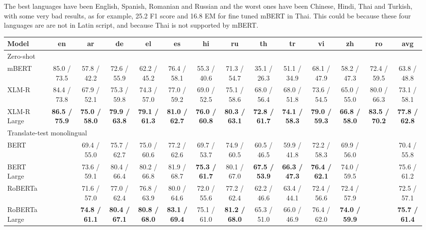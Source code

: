 \documentclass[11pt]{article}
\begin{document}
The best languages have been English, Spanish, Romanian and Russian and the worst ones have been Chinese, Hindi, Thai and Turkish, with some very bad results, as for example, 25.2 F1 score and 16.8 EM for fine tuned mBERT in Thai. This could be because these four languages are are not in Latin script, and because Thai is not supported by mBERT.

\begin{table*}[!ht]
    \centering
    \begin{adjustbox}{max width=\textwidth}
    \begin{tabular}{l|cccccccccccc|c}
        \toprule
        Model & en & ar & de & el & es & hi & ru & th & tr & vi & zh & ro & avg \\
        \midrule
        \multicolumn{14}{l}{Zero-shot} \\
        \midrule
        mBERT & 85.0 / 73.5 & 57.8 / 42.2 & 72.6 / 55.9 & 62.2 / 45.2 & 76.4 / 58.1 & 55.3 / 40.6 & 71.3 / 54.7 & 35.1 / 26.3 & 51.1 / 34.9 & 68.1 / 47.9 & 58.2 / 47.3 & 72.4 / 59.5 & 63.8 / 48.8 \\
        XLM-R & 84.4 / 73.8 & 67.9 / 52.1 & 75.3 / 59.8 & 74.3 / 57.0 & 77.0 / 59.2 & 69.0 / 52.5 & 75.1 / 58.6 & 68.0 / 56.4 & 68.0 / 51.8 & 73.6 / 54.5 & 65.0 / 55.0 & 80.0 / 66.3 & 73.1 / 58.1 \\
        XLM-R Large &\textbf{86.5 / 75.9}&\textbf{75.0 / 58.0}&\textbf{79.9 / 63.8}&\textbf{79.1 / 61.3}&\textbf{81.0 / 62.7}&\textbf{76.0 / 60.8}&\textbf{80.3 / 63.1}&\textbf{72.8 / 61.7}&\textbf{74.1 / 58.3}&\textbf{79.0 / 59.3}&\textbf{66.8 / 58.0}&\textbf{83.5 / 70.2}&\textbf{77.8 / 62.8}\\
        \midrule
        \multicolumn{14}{l}{Translate-test monolingual} \\
        \midrule
        BERT & ~ & 69.4 / 55.0 & 75.7 / 62.7 & 75.0 / 60.6 & 77.2 / 62.6 & 69.7 / 53.7 & 74.9 / 60.5 & 60.5 / 46.5 & 59.9 / 41.8 & 72.2 / 58.3 & 69.9 / 56.0 & ~ & 70.4 / 55.8 \\
        BERT Large & ~ & 73.6 / 59.1 & 80.4 / 66.4 & 80.2 / 66.8 & 81.9 / 68.7 &\textbf{75.3 / 61.7}& 80.1 / 67.0 &\textbf{67.5 / 53.9}&\textbf{66.3 / 47.3}&\textbf{76.4 / 62.1}& 74.0 / 59.5 & ~ & 75.6 / 61.2 \\
        RoBERTa & ~ & 71.6 / 57.0 & 77.0 / 62.4 & 76.8 / 63.9 & 80.0 / 64.6 & 72.0 / 55.6 & 77.2 / 62.4 & 62.2 / 46.6 & 63.4 / 44.1 & 72.4 / 56.6 & 72.4 / 57.9 & ~ & 72.5 / 57.1 \\
        RoBERTa Large & ~ &\textbf{74.8 / 61.1}&\textbf{80.4 / 67.1}&\textbf{80.8 / 68.0}&\textbf{83.1 / 69.4}& 75.1 / 61.0 &\textbf{81.2 / 68.0}& 65.3 / 51.0 & 66.0 / 46.9 & 76.4 / 62.0 &\textbf{74.0 / 59.9}& ~ &\textbf{75.7 / 61.4}\\

\end{tabular}
\end{adjustbox}
\end{table*}
\end{document}
